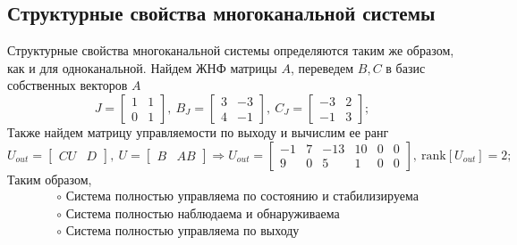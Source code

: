\documentclass[a4paper, 12pt]{article}
\begin{document}
    \subsection{Структурные свойства многоканальной системы}
    Структурные свойства многоканальной системы определяются таким
    же образом, как и для одноканальной. Найдем ЖНФ матрицы $A$,
    переведем $B,C$ в базис собственных векторов $A$
    $$
    J=\begin{bmatrix}
        1     &1\\
     0     &1
    \end{bmatrix},\ B_J=\begin{bmatrix}
        3    &-3\\
     4    &-1
    \end{bmatrix},\ C_J=\begin{bmatrix}
        -3     &2\\
    -1     &3
    \end{bmatrix};
    $$
    Также найдем матрицу управляемости по выходу и вычислим ее ранг
    $$
    U_{out}=\begin{bmatrix}
        CU &D
    \end{bmatrix},\ U=\begin{bmatrix}
        B &AB
    \end{bmatrix}\Rightarrow U_{out}=\begin{bmatrix}
        -1     &7   &-13    &10     &0     &0\\
     9     &0     &5     &1     &0     &0
    \end{bmatrix},\ \text{rank}\left[ U_{out} \right]=2;
    $$
    Таким образом,
    \begin{align*}
        &\circ \text{ Система полностью управляема по состоянию и стабилизируема}\\
        &\circ \text{ Система полностью наблюдаема и обнаруживаема}\\
        &\circ \text{ Система полностью управляема по выходу}
    \end{align*}
\end{document}
